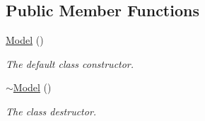 \subsection*{Public Member Functions}
\begin{DoxyCompactItemize}
\item 
\hypertarget{struct_assimp_1_1_obj_file_1_1_model_a888fc804804e7f6aa3ad43634d2ee8ab}{\hyperlink{struct_assimp_1_1_obj_file_1_1_model_a888fc804804e7f6aa3ad43634d2ee8ab}{Model} ()}\label{struct_assimp_1_1_obj_file_1_1_model_a888fc804804e7f6aa3ad43634d2ee8ab}

\begin{DoxyCompactList}\small\item\em The default class constructor. \end{DoxyCompactList}\item 
\hypertarget{struct_assimp_1_1_obj_file_1_1_model_a4960bafa08f6c411b57f9b30d8a37e0d}{\hyperlink{struct_assimp_1_1_obj_file_1_1_model_a4960bafa08f6c411b57f9b30d8a37e0d}{$\sim$\+Model} ()}\label{struct_assimp_1_1_obj_file_1_1_model_a4960bafa08f6c411b57f9b30d8a37e0d}

\begin{DoxyCompactList}\small\item\em The class destructor. \end{DoxyCompactList}\end{DoxyCompactItemize}
